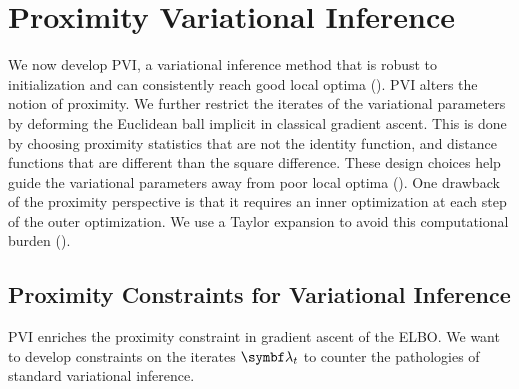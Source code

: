 \section{Proximity Variational Inference}
\label{sec:pvi}

We now develop \gls{PVI}, a variational inference method that is robust to initialization and can consistently reach good local optima ().  \gls{PVI} alters the notion of proximity. We further restrict the iterates of the variational parameters by deforming the Euclidean ball implicit in classical gradient ascent. This is done by choosing proximity statistics that are not the identity function, and distance functions that are different than the square difference. These design choices help guide the variational parameters away from poor local optima ().  One drawback of the proximity perspective is that it requires an inner optimization at each step of the outer optimization. We use a Taylor expansion to avoid this computational burden ().

\subsection{Proximity Constraints for Variational Inference}
\label{sec:method}
\gls{PVI} enriches the proximity constraint in gradient ascent of the \gls{ELBO}.  We want to develop constraints on the iterates $\mblambda_t$ to counter the pathologies of standard variational inference.

